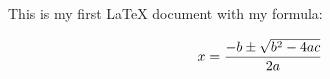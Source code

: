 \documentclass[11]{article}
\begin{document}
This is my first LaTeX document with my formula:

$$x={-b\pm\sqrt{b^2-4ac} \over 2a}$$
\end{document}
